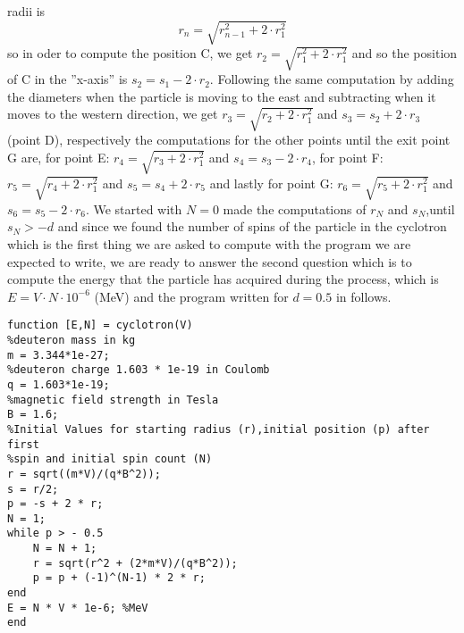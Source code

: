 \documentclass[10pt]{article}
\newcommand{\dsp}{\displaystyle}
\newcommand{\matlab}{\text{\color{red}matlab }}
\begin{document}
radii is \[
r_{n} = \sqrt{r_{n-1}^{2}+2\cdot r_{1}^{2}}
\]
so in oder to compute the position C, we get $\dsp r_{2} = \sqrt{r_1^2+2\cdot r_1^2}$ and 
so the position of C in the ''x-axis'' is $\dsp s_{2} = s_{1} - 2\cdot r_{2}$. Following 
the same computation by adding the diameters when the particle is moving to the east and 
subtracting when it moves to the western direction, we get $\dsp r_{3} = 
\sqrt{r_{2}+2\cdot r_{1}^2}$ and $\dsp s_{3} = s_{2} + 2\cdot r_{3}$ (point D), 
respectively the computations for the other points until the exit point G are, for point 
E: $\dsp r_{4} = \sqrt{r_3 + 2\cdot r_{1}^2}$ and $s_{4} = s_{3} - 2\cdot r_4$, for point 
F: $\dsp r_{5} = \sqrt{r_4+2\cdot r_{1}^{2}}$ and $s_{5} = s_{4} + 2\cdot r_5$ and 
lastly for point G: $\dsp r_{6} = \sqrt{r_{5}+2\cdot r_{1}^{2}}$ and $s_{6} = 
s_{5}-2\cdot r_{6}$. We started with $N=0$ made the computations of $r_N$ and 
$s_N$,until $s_{N} > - d$ and since we found the number of spins of the particle in the 
cyclotron which is the first thing we are asked to compute with the program we are 
expected to write, we are ready to answer the second question which is to compute the 
energy that the particle has acquired during the process, which is $E = V\cdot N\cdot 
10^{-6}$ (MeV) and the program written for $d=0.5$ in \matlab follows.
\begin{lstlisting}
function [E,N] = cyclotron(V)
%deuteron mass in kg
m = 3.344*1e-27;
%deuteron charge 1.603 * 1e-19 in Coulomb
q = 1.603*1e-19;
%magnetic field strength in Tesla
B = 1.6;
%Initial Values for starting radius (r),initial position (p) after first
%spin and initial spin count (N)
r = sqrt((m*V)/(q*B^2));
s = r/2;
p = -s + 2 * r;
N = 1;
while p > - 0.5
    N = N + 1;
    r = sqrt(r^2 + (2*m*V)/(q*B^2));
    p = p + (-1)^(N-1) * 2 * r;
end
E = N * V * 1e-6; %MeV
end
\end{lstlisting}
\end{document}
